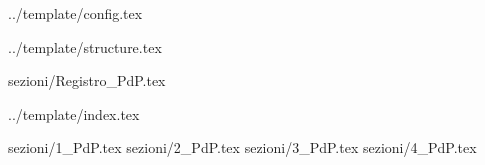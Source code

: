  {../template/config.tex}


\def\DOCUMENTO{Piano di Progetto}
\def\VERSIONE{0.0.1}

\def\DESCRIZIONE{<Info documento>}

\def\REDATTORE {<Redattore>}
\def\VERIFICATORE {<Verificatore>}
\def\RESPONSABILE {<Responsabile>}

\def\USO {<Uso>}

\def\DISTRIBUZIONE {\GRUPPO{}\\ & \COMMITTENTE{}\\}

\def\DESCRIZIONE {<descrizione>}


\def\INDICE	{true}
\def\TABELLE {true}
\def\FIGURE {true}


 {../template/structure.tex}

 {sezioni/Registro_PdP.tex}

 {../template/index.tex}


 {sezioni/1_PdP.tex}
 {sezioni/2_PdP.tex}
 {sezioni/3_PdP.tex}
 {sezioni/4_PdP.tex}





